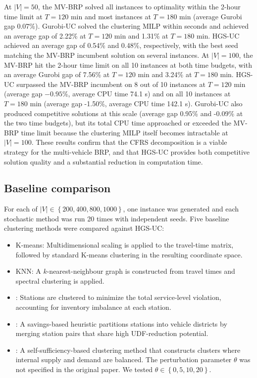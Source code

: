 At $\mid V\mid =50$, the MV-BRP solved all instances to optimality within the 2-hour time limit at $T=120$ min and most instances at $T=180$ min (average Gurobi gap 0.07\%). Gurobi-UC solved the clustering MILP within seconds and achieved an average gap of 2.22\% at $T=120$ min and 1.31\% at $T=180$ min. HGS-UC achieved an average gap of 0.54\% and 0.48\%, respectively, with the best seed matching the MV-BRP incumbent solution on several instances. At $\mid V\mid =100$, the MV-BRP hit the 2-hour time limit on all 10 instances at both time budgets, with an average Gurobi gap of 7.56\% at $T=120$ min and 3.24\% at $T=180$ min. HGS-UC surpassed the MV-BRP incumbent on 8 out of 10 instances at $T=120$ min (average gap $-0.95\%$, average CPU time 74.1 s) and on all 10 instances at $T=180$ min (average gap -1.50\%, average CPU time 142.1 s). Gurobi-UC also produced competitive solutions at this scale (average gap 0.95\% and -0.09\% at the two time budgets), but its total CPU time approached or exceeded the MV-BRP time limit because the clustering MILP itself becomes intractable at $\mid V\mid =100$. These results confirm that the CFRS decomposition is a viable strategy for the multi-vehicle BRP, and that HGS-UC provides both competitive solution quality and a substantial reduction in computation time.

\subsection{Baseline comparison}\label{ch3:subsec:baseline-comparison}

For each of $\mid V\mid \in \left\{ 200,400,800,1000 \right\}$, one instance was generated and each stochastic method was run 20 times with independent seeds. Five baseline clustering methods were compared against HGS-UC:

\begin{itemize}
\item K-means: Multidimensional scaling is applied to the travel-time matrix, followed by standard K-means clustering in the resulting coordinate space.
\item KNN: A $k$-nearest-neighbour graph is constructed from travel times and spectral clustering is applied.
\item \citet{schuijbroekInventoryRebalancingVehicle2017}: Stations are clustered to minimize the total service-level violation, accounting for inventory imbalance at each station.
\item \citet{forma3stepMathHeuristic2015}: A savings-based heuristic partitions stations into vehicle districts by merging station pairs that share high UDF-reduction potential.
\item \citet{lvHybridAlgorithmStatic2020}: A self-sufficiency-based clustering method that constructs clusters where internal supply and demand are balanced. The perturbation parameter $\theta $ was not specified in the original paper. We tested $\theta \in \left\{ 0,5,10,20 \right\}$.
\end{itemize}

